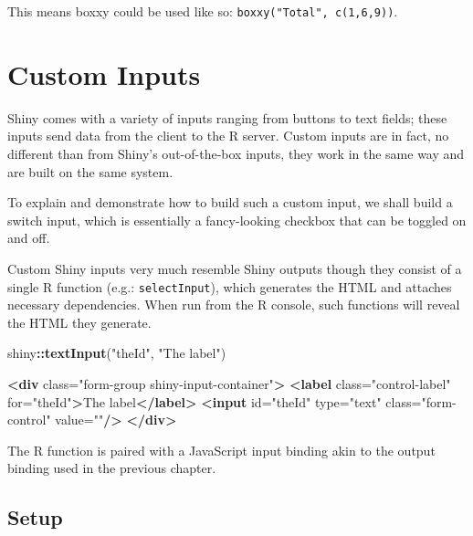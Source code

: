 \documentclass[10pt,]{krantz}
\makeatletter
\newenvironment{Shaded}{\begin{snugshade}}{\end{snugshade}}
\newcommand{\KeywordTok}[1]{\textcolor[rgb]{0.27,0.27,0.27}{\textbf{#1}}}
\newcommand{\NormalTok}[1]{#1}
\newcommand{\OperatorTok}[1]{\textcolor[rgb]{0.43,0.43,0.43}{\textbf{#1}}}
\newcommand{\OtherTok}[1]{\textcolor[rgb]{0.37,0.37,0.37}{#1}}
\newcommand{\StringTok}[1]{\textcolor[rgb]{0.5,0.5,0.5}{#1}}
\newenvironment{kframe}{%
\medskip{}
\setlength{\fboxsep}{.8em}
 \def\at@end@of@kframe{}%
 \ifinner\ifhmode%
  \def\at@end@of@kframe{\end{minipage}}%
  \begin{minipage}{\columnwidth}%
 \fi\fi%
 \def\FrameCommand##1{\hskip\@totalleftmargin \hskip-\fboxsep
 \colorbox{shadecolor}{##1}\hskip-\fboxsep
     \hskip-\linewidth \hskip-\@totalleftmargin \hskip\columnwidth}%
 \MakeFramed {\advance\hsize-\width
   \@totalleftmargin\z@ \linewidth\hsize
   \@setminipage}}%
 {\par\unskip\endMakeFramed%
 \at@end@of@kframe}
\renewenvironment{Shaded}{\begin{kframe}}{\end{kframe}}
\makeatother
\begin{document}
This means boxxy could be used like so: \texttt{boxxy("Total",\ c(1,6,9))}.

\hypertarget{shiny-input}{%
\chapter{Custom Inputs}\label{shiny-input}}

Shiny comes with a variety of inputs ranging from buttons to text fields; these inputs send data from the client to the R server. Custom inputs are in fact, no different than from Shiny's out-of-the-box inputs, they work in the same way and are built on the same system.

To explain and demonstrate how to build such a custom input, we shall build a switch input, which is essentially a fancy-looking checkbox that can be toggled on and off.

Custom Shiny inputs very much resemble Shiny outputs though they consist of a single R function (e.g.: \texttt{selectInput}), which generates the HTML and attaches necessary dependencies. When run from the R console, such functions will reveal the HTML they generate.

\begin{Shaded}
\begin{Highlighting}[]
\NormalTok{shiny}\OperatorTok{::}\KeywordTok{textInput}\NormalTok{(}\StringTok{"theId"}\NormalTok{, }\StringTok{"The label"}\NormalTok{)   }
\end{Highlighting}
\end{Shaded}

\begin{Shaded}
\begin{Highlighting}[]
\KeywordTok{<div}\OtherTok{ class=}\StringTok{"form-group shiny-input-container"}\KeywordTok{>}
  \KeywordTok{<label}\OtherTok{ class=}\StringTok{"control-label"}\OtherTok{ for=}\StringTok{"theId"}\KeywordTok{>}\NormalTok{The label}\KeywordTok{</label>}
  \KeywordTok{<input}\OtherTok{ id=}\StringTok{"theId"}\OtherTok{ type=}\StringTok{"text"}\OtherTok{ class=}\StringTok{"form-control"}\OtherTok{ value=}\StringTok{""}\KeywordTok{/>}
\KeywordTok{</div>}
\end{Highlighting}
\end{Shaded}

The R function is paired with a JavaScript input binding akin to the output binding used in the previous chapter.

\hypertarget{shiny-input-setup}{%
\section{Setup}\label{shiny-input-setup}}
\end{document}
